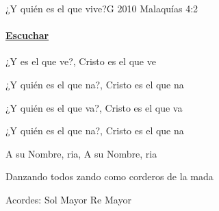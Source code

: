 \documentclass[12pt, spanish]{book}
\begin{document}
    \begin{song}{¿Y quién es el que vive?}{G}
        {2010} %
        {}
        {Malaquías 4:2} %
        {}

        \ifChordBk
        \paragraph{\mbox{}\hfill\protect\href{https://open.spotify.com/intl-es/track/1MFENNmRblmfHMTXF3tOfc}{Escuchar}\mbox{}\hfill}
        \fi

        \begin{SBOpGroup}
            ¿Y  es el que ve?, Cristo es el que ve

            ¿Y quién es el que na?, Cristo es el que na

            ¿Y quién es el que va?, Cristo es el que va

            ¿Y quién es el que na?, Cristo es el que na
        \end{SBOpGroup}
        \vskip 20pt
        \begin{SBOpGroup}
            A su Nombre, ria, A su Nombre, ria
        \end{SBOpGroup}

        \begin{SBChorus}
            Danzando todos zando como corderos de la mada
        \end{SBChorus}

        \ifChordBk
        \begin{SBOpGroup}
            Acordes:
            \upchord{\G}\qquad Sol Mayor \hfill
            \upchord{\D}\qquad Re Mayor \hfill\null\break
        \end{SBOpGroup}
        \fi
    \end{song}
\end{document}
